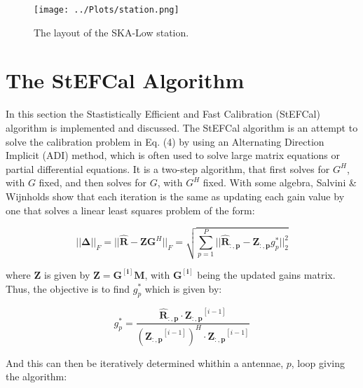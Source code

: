\documentclass[12pt]{report} %
\begin{document}
\begin{figure}[h]
    \centering
    \texttt{[image: ../Plots/station.png]}
    \caption{The layout of the SKA-Low station.}
    \label{fig:station}
\end{figure}

\section{The StEFCal Algorithm}

In this section the Stastistically Efficient and Fast Calibration (StEFCal) algorithm is implemented and discussed\cite{salvini2014fast}. The StEFCal algorithm is an attempt to solve the calibration problem in Eq. (4) by using an Alternating Direction Implicit (ADI) method, which is often used to solve large matrix equations or partial differential equations\cite{adi_method}. It is a two-step algorithm, that first solves for $G^{H}$, with $G$ fixed, and then solves for $G$, with $G^{H}$ fixed\cite{salvini2014fast}. With some algebra, Salvini \& Wijnholds show that each iteration is the same as updating each gain value by one that solves a linear least squares problem of the form:

\begin{equation}
    ||\mathbf{\Delta}||_{F} = ||\mathbf{\hat{R}} - \mathbf{Z}\mathbf{G}^{H}||_{F} = \sqrt{\sum_{p=1}^{P} ||\mathbf{\hat{R}_{:,p}} - \mathbf{Z_{:,p}}g^{*}_{p}||^{2}_{2}}
\end{equation}

where $\mathbf{Z}$ is given by $\mathbf{Z} = \mathbf{G^{[i]}}\mathbf{M}$, with $\mathbf{G^{[i]}}$ being the updated gains matrix. Thus, the objective is to find $g^{*}_{p}$ which is given by:

\begin{equation}
    g^{*}_{p} = \frac{\mathbf{\hat{R}_{:,p}} \cdot \mathbf{Z_{:,p}}^{[i - 1]}}{(\mathbf{Z_{:,p}}^{[i - 1]})^{H} \cdot \mathbf{Z_{:,p}}^{[i - 1]}}
\end{equation}

And this can then be iteratively determined whithin a antennae, $p$, loop giving the algorithm:
\end{document}
